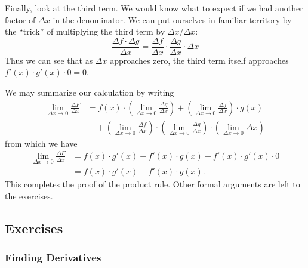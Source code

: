 Finally, look at the third term.  We would know what to expect if we
had another factor of $\Delta x$ in the denominator.  We can put
ourselves in familiar territory by the ``trick'' of multiplying the
third term by $\Delta x/ \Delta x$:
\[
\frac{\Delta f \cdot \Delta g}{\Delta x} 
= \frac{\Delta f}{\Delta x} \cdot \frac{\Delta g}{\Delta x} \cdot \Delta x
\] 
Thus we can see that as $\Delta x$ approaches zero, the third term
itself approaches $f'(x) \cdot g'(x) \cdot 0 = 0$.



     We may summarize our calculation by writing
\begin{align*}
\lim_{\Delta x \rightarrow 0} \frac{\Delta F}{\Delta x} &= 
      f(x)\cdot\left(\lim_{\Delta x \rightarrow 0} 
      \frac{\Delta g}{\Delta x}\right)  +  
      \left(\lim_{\Delta x \rightarrow 0} 
      \frac{\Delta f}{\Delta x}\right) \cdot g(x) \\
&    \quad + \left(\lim_{\Delta x \rightarrow 0} 
      \frac{\Delta f}{\Delta x}\right)\cdot 
      \left(\lim_{\Delta x \rightarrow 0}
      \frac{\Delta g}{\Delta x}\right) \cdot
      \left(\lim_{\Delta x \rightarrow 0} \Delta x\right)
\end{align*}
from which we have
\begin{align*}
\lim_{\Delta x \rightarrow 0} \frac{\Delta F}{\Delta x} &= 
   f(x) \cdot g'(x) + f'(x) \cdot g(x) + f'(x) \cdot g'(x) \cdot 0  \\
            &= f(x) \cdot g'(x) + f'(x) \cdot g(x).
\end{align*}
This completes the proof of the product rule.  Other formal arguments are left to the exercises.

\subsection{Exercises}
\label{subsec:exercises}

\subsubsection{Finding Derivatives}
\label{subsubsec:finding-derivatives}



